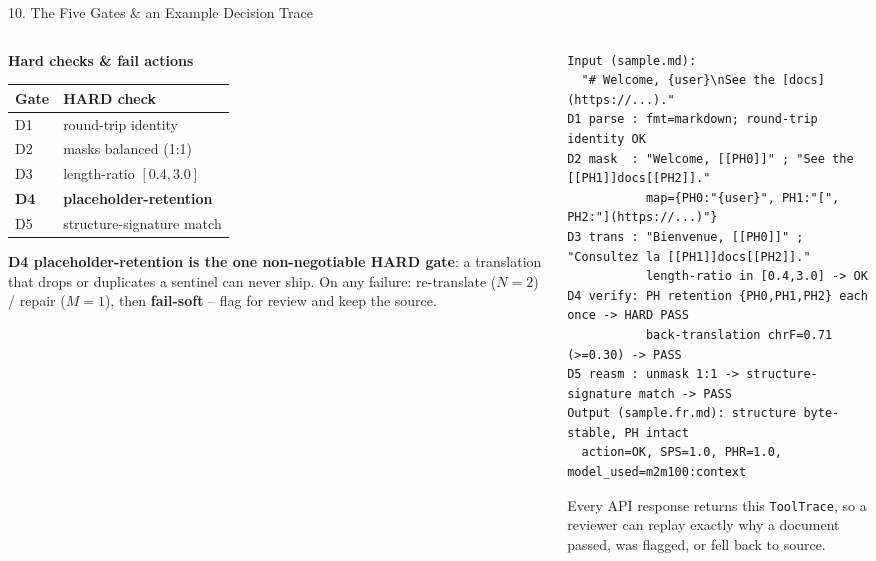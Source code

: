 \documentclass[10pt,aspectratio=169]{beamer}
\begin{document}
\begin{frame}[fragile]{10. The Five Gates \& an Example Decision Trace}
\begin{columns}[T]
\begin{column}{0.4\textwidth}
\textbf{Hard checks \& fail actions}
\begin{table}[h]
\centering\tiny
\begin{tabular}{ll}
\toprule
\textbf{Gate} & \textbf{HARD check} \\
\midrule
D1 & round-trip identity \\
D2 & masks balanced (1:1) \\
D3 & length-ratio $[0.4,3.0]$ \\
\textbf{D4} & \textbf{placeholder-retention} \\
D5 & structure-signature match \\
\bottomrule
\end{tabular}
\end{table}
\scriptsize \textbf{D4 placeholder-retention is the one non-negotiable HARD gate}: a translation that drops or duplicates a sentinel can never ship. On any failure: re-translate ($N{=}2$) / repair ($M{=}1$), then \textbf{fail-soft} -- flag for review and keep the source.
\end{column}
\begin{column}{0.6\textwidth}
\begin{lstlisting}[basicstyle=\ttfamily\tiny]
Input (sample.md):
  "# Welcome, {user}\nSee the [docs](https://...)."
D1 parse : fmt=markdown; round-trip identity OK
D2 mask  : "Welcome, [[PH0]]" ; "See the [[PH1]]docs[[PH2]]."
           map={PH0:"{user}", PH1:"[", PH2:"](https://...)"}
D3 trans : "Bienvenue, [[PH0]]" ; "Consultez la [[PH1]]docs[[PH2]]."
           length-ratio in [0.4,3.0] -> OK
D4 verify: PH retention {PH0,PH1,PH2} each once -> HARD PASS
           back-translation chrF=0.71 (>=0.30) -> PASS
D5 reasm : unmask 1:1 -> structure-signature match -> PASS
Output (sample.fr.md): structure byte-stable, PH intact
  action=OK, SPS=1.0, PHR=1.0, model_used=m2m100:context
\end{lstlisting}
\scriptsize Every API response returns this \texttt{ToolTrace}, so a reviewer can replay exactly why a document passed, was flagged, or fell back to source.
\end{column}
\end{columns}
\end{frame}
\end{document}
